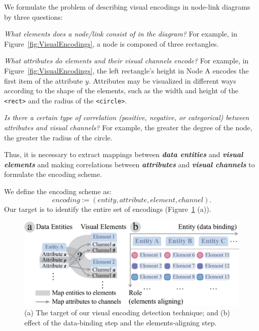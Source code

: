 We formulate the problem of describing visual encodings in node-link diagrams by three questions:
\begin{compactenum}[\textbf{Q}1]
    \item \textit{What elements does a node/link consist of in the diagram?} 
    For example, in Figure~\ref{fig:VisualEncodings}, a node is composed of three rectangles. \label{qstn:composition}
    
    \item \textit{What attributes do elements and their visual channels encode?} 
    For example, in Figure~\ref{fig:VisualEncodings}, the left rectangle's height in Node A encodes the first item of the attribute $y$. 
    Attributes may be visualized in different ways according to the shape of the elements, such as the width and height of the \texttt{<rect>} and the radius of the \texttt{<circle>}.\label{qstn:encodings}
    
    \item \textit{Is there a certain type of correlation (positive, negative, or categorical) between attributes and visual channels?}
    For example, the greater the degree of the node, the greater the radius of the circle.\label{qstn:correlation}
\end{compactenum}
Thus, it is necessary to extract mappings between \textbf{\textit{data entities}} and \textbf{\textit{visual elements}} and making correlations between \textbf{\textit{attributes}} and \textbf{\textit{visual channels}} to formulate the encoding scheme.

We define the encoding scheme as:
\begin{equation}
encoding := (entity, attribute, element, channel).
\end{equation}
Our target is to identify the entire set of encodings (Figure~\ref{fig:ElementAligning} (a)).

\begin{figure}[ht]
    \centering
    \includegraphics[width=1\columnwidth]{figures/ElementAligning.eps}
    \caption{(a) The target of our visual encoding detection technique; and (b) effect of the data-binding step and the elements-aligning step.}
    \label{fig:ElementAligning}
\end{figure}

